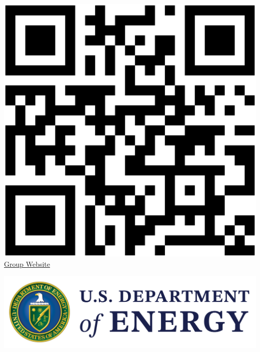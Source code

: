 {\begin{center}
    \vspace{-0.5em}
    \begin{minipage}{.2\linewidth}
        \centering
        \includegraphics[width=.8\linewidth]{img/qrcode.eps}
        \vspace{-1em}
        \href{https://arfc.github.io/}{\underline{Group Website}}
    \end{minipage}
    \begin{minipage}{0.7\linewidth}
        \begin{tcolorbox}[colback=white, colframe=black, width=\linewidth, height=.275\linewidth, boxrule=1pt]
            \begin{center}
                \begin{minipage}{.3\linewidth}
                    \begin{center}
                        \includegraphics[width = \linewidth]{img/doe.png}

\end{center}
\end{minipage}
\end{center}
\end{tcolorbox}
\end{minipage}
\end{center}}
